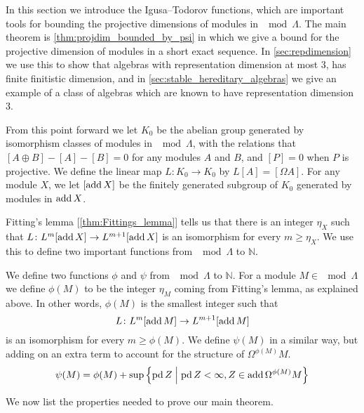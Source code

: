 In this section we introduce the Igusa--Todorov functions, which are important tools for bounding the projective dimensions of modules in $\mod \Lambda$. The main theorem is \cref{thm:projdim_bounded_by_psi} in which we give a bound for the projective dimension of modules in a short exact sequence. In \cref{sec:repdimension} we use this to show that algebras with representation dimension at most 3, has finite finitistic dimension, and in \cref{sec:stable_hereditary_algebras} we give an example of a class of algebras which are known to have representation dimension 3.

From this point forward we let $K_0$ be the abelian group generated by isomorphism classes of modules in $\mod\Lambda$, with the relations that $[A\oplus B] - [A] - [B] = 0$ for any modules $A$ and $B$, and $[P]=0$ when $P$ is projective. We define the linear map $L\colon K_0\to K_0$ by $L[A] = [\Omega A]$. For any module $X$, we let $[\operatorname{add} X]$ be the finitely generated subgroup of $K_0$ generated by modules in $\operatorname{add} X$. 

Fitting's lemma [\cref{thm:Fittings_lemma}] tells us that there is an integer $\eta_X$ such that $L\colon L^m[\operatorname{add} X] \to L^{m+1}[\operatorname{add} X]$ is an isomorphism for every $m \geq \eta_X$. We use this to define two important functions from $\mod \Lambda$ to $\mathbb N$.

\begin{defn}
	We define two functions $\phi$ and $\psi$ from $\mod\Lambda$ to $\mathbb N$. For a module $M \in \mod\Lambda$ we define $\phi(M)$ to be the integer $\eta_M$ coming from Fitting's lemma, as explained above. In other words, $\phi(M)$ is the smallest integer such that $$L\colon L^m[\operatorname{add} M] \to L^{m+1}[\operatorname{add} M]$$ is an isomorphism for every $m \geq \phi(M)$. We define $\psi(M)$ in a similar way, but adding on an extra term to account for the structure of $\Omega^{\phi(M)}M$. 
	$$\psi(M) = \phi(M) + \sup\left\lbrace\operatorname{pd} Z \; \middle| \; \operatorname{pd} Z < \infty, Z \in \operatorname{add} \Omega^{\phi(M)}M\right\rbrace$$
\end{defn}

We now list the properties needed to prove our main theorem.

